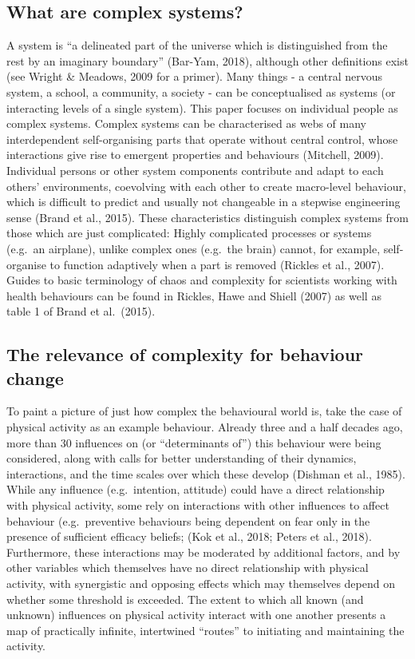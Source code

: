 \documentclass[
  british,
  man,floatsintext]{apa6}
\begin{document}
\hypertarget{what-are-complex-systems}{%
\subsection{What are complex systems?}\label{what-are-complex-systems}}

A system is \enquote{a delineated part of the universe which is distinguished from the rest by an imaginary boundary} (Bar-Yam, 2018), although other definitions exist (see Wright \& Meadows, 2009 for a primer). Many things - a central nervous system, a school, a community, a society - can be conceptualised as systems (or interacting levels of a single system). This paper focuses on individual people as complex systems. Complex systems can be characterised as webs of many interdependent self-organising parts that operate without central control, whose interactions give rise to emergent properties and behaviours (Mitchell, 2009). Individual persons or other system components contribute and adapt to each others' environments, coevolving with each other to create macro-level behaviour, which is difficult to predict and usually not changeable in a stepwise engineering sense (Brand et al., 2015). These characteristics distinguish complex systems from those which are just complicated: Highly complicated processes or systems (e.g.~an airplane), unlike complex ones (e.g.~the brain) cannot, for example, self-organise to function adaptively when a part is removed (Rickles et al., 2007). Guides to basic terminology of chaos and complexity for scientists working with health behaviours can be found in Rickles, Hawe and Shiell (2007) as well as table 1 of Brand et al.~(2015).

\hypertarget{the-relevance-of-complexity-for-behaviour-change}{%
\subsection{The relevance of complexity for behaviour change}\label{the-relevance-of-complexity-for-behaviour-change}}

To paint a picture of just how complex the behavioural world is, take the case of physical activity as an example behaviour. Already three and a half decades ago, more than 30 influences on (or \enquote{determinants of}) this behaviour were being considered, along with calls for better understanding of their dynamics, interactions, and the time scales over which these develop (Dishman et al., 1985). While any influence (e.g.~intention, attitude) could have a direct relationship with physical activity, some rely on interactions with other influences to affect behaviour (e.g.~preventive behaviours being dependent on fear only in the presence of sufficient efficacy beliefs; (Kok et al., 2018; Peters et al., 2018). Furthermore, these interactions may be moderated by additional factors, and by other variables which themselves have no direct relationship with physical activity, with synergistic and opposing effects which may themselves depend on whether some threshold is exceeded. The extent to which all known (and unknown) influences on physical activity interact with one another presents a map of practically infinite, intertwined \enquote{routes} to initiating and maintaining the activity.
\end{document}
